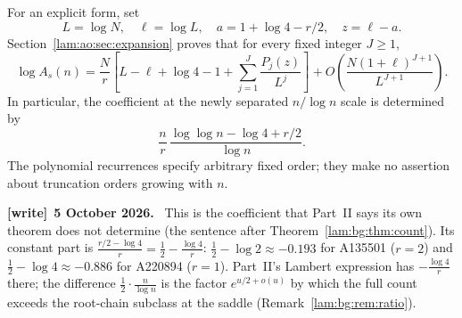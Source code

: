 \documentclass[11pt,a4paper]{article}
\numberwithin{equation}{section}
\theoremstyle{remark}
\newenvironment{writenote}[1][]{\par\smallskip\begingroup\small
 \noindent\textbf{[write]}\if\relax\detokenize{#1}\relax\else~\textbf{#1.}\fi\ }%
 {\par\endgroup\smallskip}
\begin{document}
For an explicit form, set
\begin{equation}\label{lam:ao:eq:z}
 L=\log N,\quad \ell=\log L,\quad a=1+\log4-r/2,\quad z=\ell-a.
\end{equation}
Section~\ref{lam:ao:sec:expansion} proves that for every fixed integer $J\ge1$,
\begin{equation}\label{lam:ao:eq:allorders}
 \log A_s(n)=\frac Nr\left[L-\ell+\log4-1+
        \sum_{j=1}^J\frac{P_j(z)}{L^j}\right]
 +O\!\left(\frac{N(1+\ell)^{J+1}}{L^{J+1}}\right).
\end{equation}
In particular, the coefficient at the newly separated $n/\log n$ scale is determined by
\[
 \frac nr\,\frac{\log\log n-\log4+r/2}{\log n}.
\]
The polynomial recurrences specify arbitrary fixed order; they make no assertion about truncation orders growing with $n$.
\begin{writenote}[5 October 2026]
This is the coefficient that Part~II says its own theorem does not determine (the sentence after Theorem~\ref{lam:bg:thm:count}). Its constant part is $\frac{r/2-\log4}r=\frac12-\frac{\log4}r$: $\frac12-\log2\approx-0.193$ for A135501 ($r=2$) and $\frac12-\log4\approx-0.886$ for A220894 ($r=1$). Part~II's Lambert expression has $-\frac{\log4}r$ there; the difference $\frac12\cdot\frac n{\log n}$ is the factor $e^{u/2+o(u)}$ by which the full count exceeds the root-chain subclass at the saddle (Remark~\ref{lam:bg:rem:ratio}).
\end{writenote}
\end{document}
